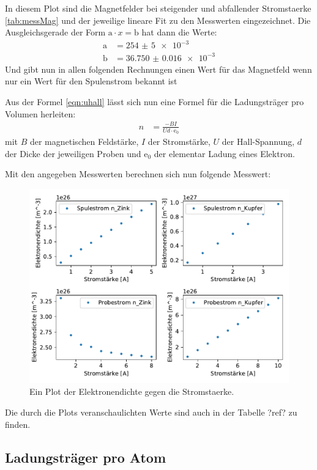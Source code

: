     In diesem Plot sind die Magnetfelder bei steigender und abfallender Stromstaerke \ref{tab:messMag} und der jeweilige lineare Fit zu den 
    Messwerten eingezeichnet.
    Die Ausgleichsgerade der Form $\text{a}\cdot x = \text{b}$ hat dann die Werte:
    \begin{align}
        \text{a} & = \num{254(5)e-3}\\
        \text{b} & = \num{36.750(16)e-3}
    \end{align}
    Und gibt nun in allen folgenden Rechnungen einen Wert für das Magnetfeld wenn nur ein Wert für den Spulenstrom bekannt ist


    Aus der Formel \ref{eqn:uhall} lässt sich nun eine Formel für die Ladungsträger pro Volumen herleiten:
    \begin{align}
        n &= \frac{-BI}{Ud\cdot\text{e}_0}
    \end{align}
    mit $B$ der magnetischen Feldstärke, $I$ der Stromstärke, $U$ der Hall-Spannung, $d$ der Dicke der jeweiligen Proben und $\text{e}_0$ der 
    elementar Ladung eines Elektron.

    Mit den angegeben Messwerten berechnen sich nun folgende Messwert:
    \begin{figure}[H]
        \centering
        \includegraphics[width=1.1\textwidth]{build/N.pdf}
        \caption{Ein Plot der Elektronendichte gegen die Stromstaerke.}
        \label{img:elekdichte}
    \end{figure}
    Die durch die Plots veranschaulichten Werte sind auch in der Tabelle ?ref? zu finden.


    \subsection{Ladungsträger pro Atom}


